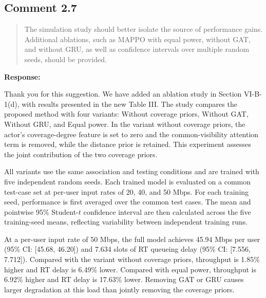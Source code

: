 \documentclass[11pt,a4paper]{article}
\begin{document}

\subsection*{Comment 2.7}

\begin{quote}\small The simulation study should better isolate the source of performance gains. Additional ablations, such as MAPPO with equal power, without GAT, and without GRU, as well as confidence intervals over multiple random seeds, should be provided.\end{quote}

\textbf{Response:}\par

Thank you for this suggestion. We have added an ablation study in Section VI-B-1(d), with results presented in the new Table III. The study compares the proposed method with four variants: Without coverage priors, Without GAT, Without GRU, and Equal power. In the variant without coverage priors, the actor's coverage-degree feature is set to zero and the common-visibility attention term is removed, while the distance prior is retained. This experiment assesses the joint contribution of the two coverage priors.
\par

All variants use the same association and testing conditions and are trained with five independent random seeds. Each trained model is evaluated on a common test-case set at per-user input rates of 20, 40, and 50 Mbps. For each training seed, performance is first averaged over the common test cases. The mean and pointwise 95\% Student-$t$ confidence interval are then calculated across the five training-seed means, reflecting variability between independent training runs.
\par

At a per-user input rate of 50 Mbps, the full model achieves 45.94 Mbps per user (95\% CI: [45.68, 46.20]) and 7.634 slots of RT queueing delay (95\% CI: [7.556, 7.712]). Compared with the variant without coverage priors, throughput is 1.85\% higher and RT delay is 6.49\% lower. Compared with equal power, throughput is 6.92\% higher and RT delay is 17.63\% lower. Removing GAT or GRU causes larger degradation at this load than jointly removing the coverage priors.
\par
\end{document}
